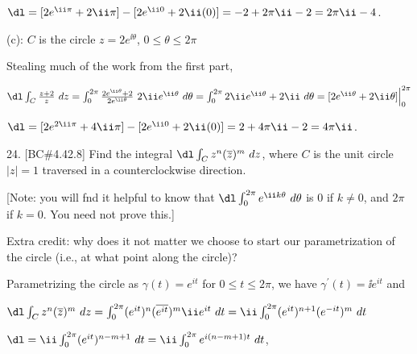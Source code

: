\item{} $\dl = [2e^{\ii\pi}+2\ii\pi]-[2e^{\ii 0}+2\ii(0)] = -2+2\pi\ii-2 = 2\pi\ii-4$.

\msk


\item{} (c): $C$ is the circle $z=2e^{\ii\theta}$, $0\leq \theta\leq 2\pi$

\msk

\item{}Stealing much of the work from the first part, 

\ssk

\item{}$\dl \int_C{{z+2}\over{z}}\ dz = 
\int_0^{2\pi}{{2e^{\ii\theta}+2}\over{2e^{\ii\theta}}}\ 2\ii e^{\ii\theta}\ d\theta
 = \int_0^{2\pi} 2\ii e^{\ii\theta}+2\ii\ d\theta = [2e^{\ii\theta}+2\ii\theta]\Big|_0^{2\pi}$

\item{} $\dl = [2e^{2\ii\pi}+4\ii\pi]-[2e^{\ii 0}+2\ii(0)] = 2+4\pi\ii-2 = 4\pi\ii$.


\bsk


\item{24.} [BC\#4.42.8] Find the integral $\dl \int_C z^n(\overline{z})^m\ dz$, where
$C$ is the unit circle $|z|=1$ traversed in a counterclockwise direction.


\msk


\item{} [Note: you will fnd it helpful to know that $\dl \int_{0}^{2\pi} e^{\ii k\theta}\ d\theta$
is $0$ if $k\neq 0$, and $2\pi$ if $k=0$. You need not prove this.]


\msk


\item{} Extra credit: why does it not matter  we choose to start our parametrization
of the circle (i.e., at what point along the circle)?


\msk

\item{} Parametrizing the circle as $\gamma(t)=e^{it}$ for $0\leq t\leq 2\pi$, we have
$\gamma^\prime(t) = \ii e^{it}$ and

\ssk

\item{} $\dl \int_C z^n(\overline{z})^m\ dz = \int_0^{2\pi} (e^{it})^n (\overline{e^{it}})^m\ii e^{it}\ dt
= \ii\int_0^{2\pi} (e^{it})^{n+1}(e^{-it})^m\ dt$

\item{} $\dl
= \ii\int_0^{2\pi} (e^{it})^{n-m+1}\ dt = \ii\int_0^{2\pi} e^{i(n-m+1)t}\ dt$,


